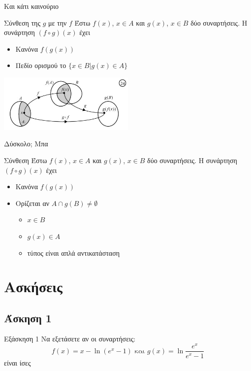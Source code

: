 \documentclass[greek]{beamer}
\begin{document}
\begin{frame}{Και κάτι καινούριο}
      \begin{block}{Σύνθεση της $g$ με την $f$}
            Έστω $f(x)$, $x\in Α$ και $g(x)$, $x\in Β$ δύο συναρτήσεις. Η συνάρτηση $(f\circ g)(x)$ έχει
            \begin{itemize}
                  \item Κανόνα $f(g(x))$
                  \item Πεδίο ορισμού το $\{x\in Β | g(x)\in Α \}$
            \end{itemize}
      \end{block}
      \centering
      \includegraphics[width=0.5\textwidth]{"images/1.2 Σύνθεση.png"}
\end{frame}

\begin{frame}{Δύσκολο; Μπα}
      \begin{block}{Σύνθεση}
            Έστω $f(x)$, $x\in Α$ και $g(x)$, $x\in Β$ δύο συναρτήσεις. Η συνάρτηση $(f\circ g)(x)$ έχει
            \begin{itemize}
                  \item Κανόνα $f(g(x))$
                  \item Ορίζεται αν $Α\cap g(Β)\ne \emptyset$
                        \begin{itemize}
                              \item<2-> $x\in Β$
                              \item<3-> $g(x)\in Α$
                              \item<4-> τύπος είναι απλά αντικατάσταση
                        \end{itemize}
            \end{itemize}
      \end{block}
\end{frame}

\section{Ασκήσεις}

\subsection{Άσκηση 1}
\begin{frame}[label=Άσκηση1,t]{Εξάσκηση 1}
      Να εξετάσετε αν οι συναρτήσεις:
      $$f(x)=x-\ln (e^x-1) \text{ και } g(x)=\ln\frac{e^x}{e^x-1}$$
      είναι ίσες

\end{frame}
\end{document}
